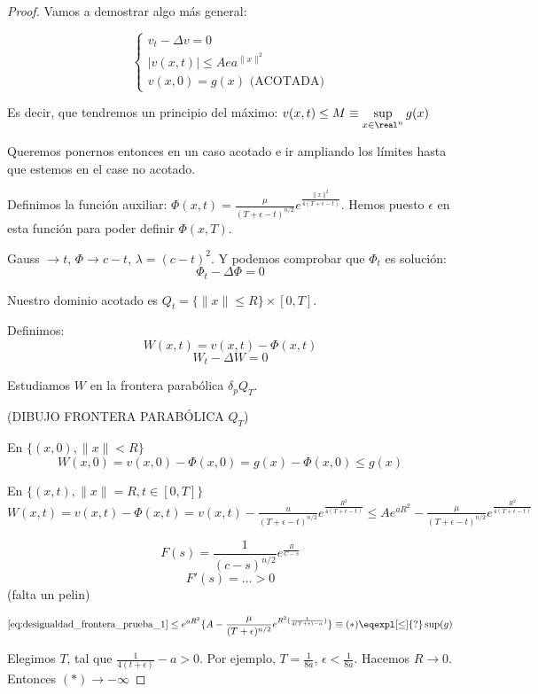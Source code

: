  			\begin{proof}
 				Vamos a demostrar algo más general:

 				\[\begin{cases}
 					v_t - \Delta v = 0 \\
 					|v(x,t)| \leq A ea^{\|x\|^2} \\
 					v(x,0) = g(x) \text{ (ACOTADA)}
 				\end{cases}\]

 				Es decir, que tendremos un principio del máximo: $v(x,t) \leq M \equiv \sup\limits_{x \in \real^n} g(x)$

 				Queremos ponernos entonces en un caso acotado e ir ampliando los límites hasta que estemos en el case no acotado.

 				Definimos la función auxiliar: $\Phi(x,t) = \frac{\mu}{(T+\epsilon -t)^{n/2}} e^{\frac{\|x\|^2}{4(T + \epsilon - t)}}$. Hemos puesto $\epsilon$ en esta función para poder definir $\Phi(x,T)$.

 				Gauss $\to t$, $\Phi \to c - t$, $\lambda = (c-t)^2$. Y podemos comprobar que $\Phi_t$ es solución:
 				\[ \Phi_t - \Delta \Phi = 0\]

 				Nuestro dominio acotado es $Q_t = \{ \|x\| \leq R \} \times [0,T]$.

 				Definimos:
 				\[ W(x,t) = v(x,t) - \Phi(x,t) \]
 				\[ W_t - \Delta W = 0\]

 				Estudiamos $W$ en la frontera parabólica $\delta_p Q_T$.


 				(DIBUJO FRONTERA PARABÓLICA $Q_T$)

 				En $\{(x,0), \|x\| < R\}$
 				\[ W(x,0) = v(x,0) - \Phi(x,0) = g(x) - \Phi(x,0) \leq g(x) \]

 				En $\{(x,t), \|x\| = R, t \in [0,T]\}$
 				\( W(x,t) = v(x,t) - \Phi(x,t) = v(x,t) - \frac{u}{(T + \epsilon - t)^{n/2}} e^{\frac{R^2}{4(T+\epsilon-t)}} \leq Ae^{aR^2} - \frac{\mu}{(T + \epsilon -t)^{n/2}} e^{\frac{R^2}{4(T + \epsilon - t)}} \label{eq:desigualdad_frontera_prueba_1} \)

 				\obs
 				\[ F(s) = \frac{1}{(c-s)^{n/2}} e^{\frac{B}{C-s}}\]
 				\[F'(s) = … > 0\]
 				(falta un pelin)

 				\[ \ref{eq:desigualdad_frontera_prueba_1} \leq e^{aR^2} \{A-\frac{\mu}{(T+\epsilon)^{n/2}} e^{R^2(\frac{1}{4(T+\epsilon)-a})}\} \equiv (*)\eqexpl[\leq]{?} \sup(g)\]

 				Elegimos $T$, tal que $\frac{1}{4(t+\epsilon)}-a > 0$. Por ejemplo, $T = \frac{1}{8a}$, $\epsilon < \frac{1}{8a}$. Hacemos $R \to 0$. Entonces $(*) \to - \infty$


\end{proof}
